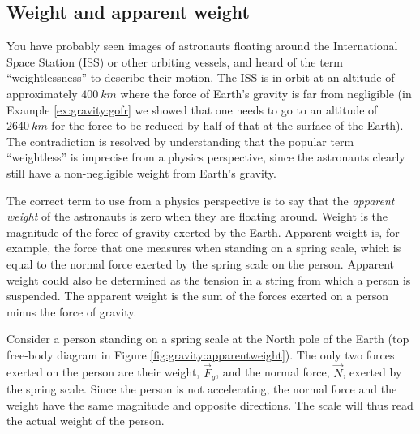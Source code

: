 \subsection{Weight and apparent weight}
You have probably seen images of astronauts floating around the International Space Station (ISS) or other orbiting vessels, and heard of the term ``weightlessness''  to describe their motion. The ISS is in orbit at an altitude of approximately $\SI{400}{km}$ where the force of Earth's gravity is far from negligible (in Example \ref{ex:gravity:gofr} we showed that one needs to go to an altitude of $\SI{2640}{km}$ for the force to be reduced by half of that at the surface of the Earth). The contradiction is resolved by understanding that the popular term ``weightless'' is imprecise from a physics perspective, since the astronauts clearly still have a non-negligible weight from Earth's gravity.

The correct term to use from a physics perspective is to say that the \textit{apparent weight} of the astronauts is zero when they are floating around. Weight is the magnitude of the force of gravity exerted by the Earth. Apparent weight is, for example, the force that one measures when standing on a spring scale, which is equal to the normal force exerted by the spring scale on the person. Apparent weight could also be determined as the tension in a string from which a person is suspended. The apparent weight is the sum of the forces exerted on a person minus the force of gravity.

Consider a person standing on a spring scale at the North pole of the Earth (top free-body diagram in Figure \ref{fig:gravity:apparentweight}). The only two forces exerted on the person are their weight, $\vec F_g$, and the normal force, $\vec N$, exerted by the spring scale. Since the person is not accelerating, the normal force and the weight have the same magnitude and opposite directions. The scale will thus read the actual weight of the person.


